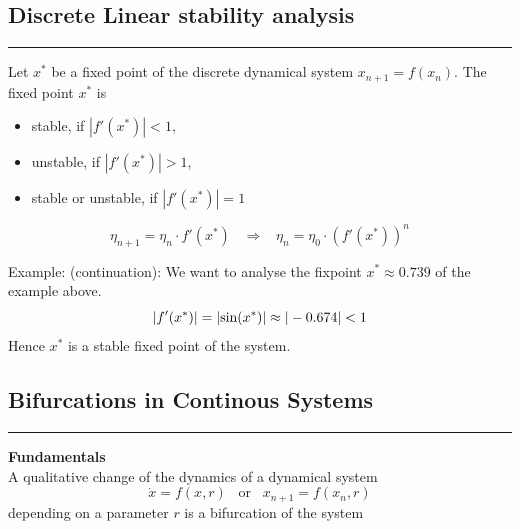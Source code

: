 \subsection{Discrete Linear stability analysis}
\noindent\rule[\linienAbstand]{\linewidth}{\linienDicke}
Let $x^*$ be a fixed point of the discrete dynamical system $x_{n+1} = f(x_n)$. The fixed point $x^*$ is
\begin{itemize}
  \item stable, if $|f'(x^*)| < 1$,
  \item unstable, if $|f'(x^*)| > 1$,
  \item stable or unstable, if  $|f'(x^*)| = 1$
\end{itemize}

\begin{equation}
  \eta_{n+1} = \eta_n \cdot f'(x^*) \;\;\; \Rightarrow \;\;\;
  \eta_n = \eta_0 \cdot \left(f'(x^*)\right)^n
\end{equation}

Example: (continuation): We want to analyse the fixpoint $x^* \approx 0.739$ of the example above.
\begin{equation}
  |f'(x^*)| = |\textup{sin}(x^*)| \approx |-0.674| < 1
\end{equation}
Hence $x^*$ is a stable fixed point of the system.

\subsection{Bifurcations in Continous Systems}
\noindent\rule[\linienAbstand]{\linewidth}{\linienDicke}

\textbf{Fundamentals}\\
A qualitative change of the dynamics of a dynamical system
\begin{equation}
  \dot{x} = f(x, r) \;\;\; \text{or} \;\;\; x_{n+1} = f(x_n, r)
\end{equation}
depending on a parameter $r$ is a bifurcation of the system\\

